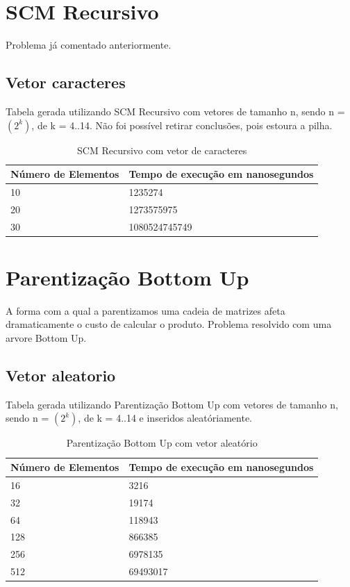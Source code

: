\documentclass[12pt,a4paper,twoside]{report}
\begin{document}
\section{SCM Recursivo}

Problema já comentado anteriormente.

\subsection{Vetor caracteres}
Tabela gerada utilizando SCM Recursivo com vetores de tamanho n, sendo n = $(2^k)$, de k = 4..14.
Não foi possível retirar conclusões, pois estoura a pilha.
\begin{table}[H]
\centering
\caption{SCM Recursivo com vetor de caracteres}
\label{my-label}
\begin{tabular}{|l|l|}
\hline
\multicolumn{1}{|c|}{\textbf{Número de Elementos}} & \multicolumn{1}{c|}{\textbf{Tempo de execução em nanosegundos}} \\ \hline
10 & 1235274 \\ \hline
20 & 1273575975 \\ \hline
30 & 1080524745749 \\ \hline
\end{tabular}
\end{table}

\section{Parentização Bottom Up}

A forma com a qual a parentizamos uma cadeia de matrizes afeta dramaticamente o custo de calcular o produto. Problema resolvido com uma arvore Bottom Up.

\subsection{Vetor aleatorio}
Tabela gerada utilizando Parentização Bottom Up com vetores de tamanho n, sendo n = $(2^k)$, de k = 4..14 e inseridos aleatóriamente.
\begin{table}[H]
\centering
\caption{Parentização Bottom Up com vetor aleatório}
\label{my-label}
\begin{tabular}{|l|l|}
\hline
\multicolumn{1}{|c|}{\textbf{Número de Elementos}} & \multicolumn{1}{c|}{\textbf{Tempo de execução em nanosegundos}} \\ \hline
16 & 3216 \\ \hline
32 & 19174 \\ \hline
64 & 118943 \\ \hline
128 & 866385 \\ \hline
256 & 6978135 \\ \hline
512 & 69493017 \\ \hline
\end{tabular}
\end{table}
\end{document}
